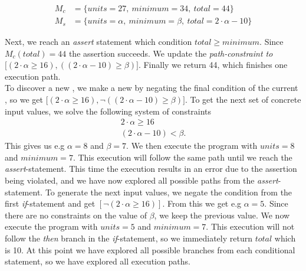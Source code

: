 \begin{align*}
	M_c & = \{units = 27, \ minimum = 34, \ total = 44 \}\\
	M_s & = \{ units = \alpha, \ minimum = \beta, \ total = 2 \cdot \alpha - 10 \}
\end{align*}

Next, we reach an \textsl{assert} statement which condition $total \geq minimum$. Since $M_c(total) = 44$ the assertion succeeds. We update the \emph{path-constraint to} $\lbrack (2\cdot \alpha \geq 16) , ((2\cdot \alpha - 10) \geq \beta) \rbrack$. Finally we return 44, which finishes one execution path.\\
To discover a new \pc, we make a new \pc by negating the final condition of the current \pc, so we get $\lbrack (2\cdot \alpha \geq 16), \neg ((2\cdot \alpha - 10) \geq \beta) \rbrack$. To get the next set of concrete input values, we solve the following system of constraints
\begin{align*}
	2\cdot \alpha \geq 16\\
	(2\cdot \alpha - 10) < \beta.
\end{align*}
This gives us e.g $\alpha = 8$ and $\beta = 7$. 
We then execute the program with $units = 8$ and $minimum = 7$. This execution will follow the same path until we reach the \textsl{assert}-statement. This time the execution results in an error due to the assertion being violated, and we have now explored all possible paths from the \textsl{assert}-statement. To generate the next input values, we negate the condition from the first \textsl{if}-statement and get $[\neg (2\cdot \alpha \geq 16)]$. From this we get e.g $\alpha = 5$. Since there are no constraints on the value of $\beta$, we keep the previous value.  We now execute the program with $units = 5$ and $minimum = 7$. This execution will not follow the \textsl{then} branch in the \textsl{if}-statement, so we immediately return $total$ which is 10. At this point we have explored all possible branches from each conditional statement, so we have explored all execution paths. 

